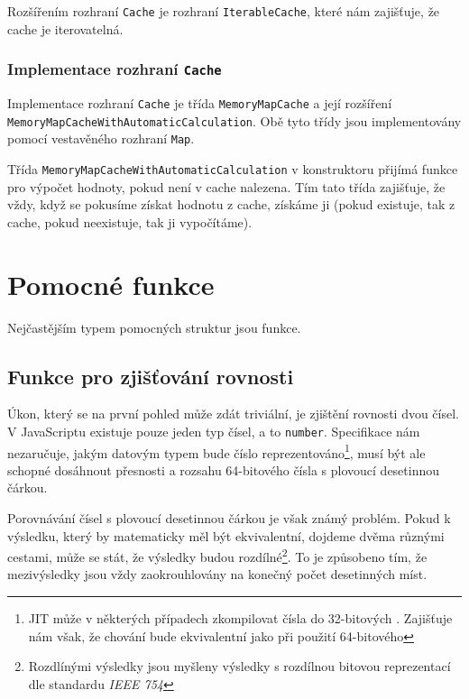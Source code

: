 Rozšířením rozhraní \texttt{Cache} je rozhraní \texttt{IterableCache}\cite[line 49 - 54]{geometryjs:source:interfaces:cache.ts}, které nám zajišťuje, že cache je iterovatelná.

\subsubsection[Implementace]{Implementace rozhraní \texttt{Cache}}
\label{subsubsec:helper-class-cache-implementation}

Implementace rozhraní \texttt{Cache} je třída \texttt{MemoryMapCache}\cite[line 7 - 33]{geometryjs:source:helpers:memoryMapCache.ts} a její rozšíření \texttt{MemoryMapCacheWithAutomaticCalculation}\cite[line 38 - 59]{geometryjs:source:helpers:memoryMapCache.ts}.
Obě tyto třídy jsou implementovány pomocí vestavěného rozhraní \texttt{Map}\cite{mdn:map}.

Třída \texttt{MemoryMapCacheWithAutomaticCalculation} v konstruktoru přijímá funkce pro výpočet hodnoty, pokud není v cache nalezena.
Tím tato třída zajišťuje, že vždy, když se pokusíme získat hodnotu z cache, získáme ji (pokud existuje, tak z cache, pokud neexistuje, tak ji vypočítáme).

\section{Pomocné funkce}
\label{sec:helper-functions}

Nejčastějším typem pomocných struktur jsou funkce. 

\subsection[Rovnost]{Funkce pro zjišťování rovnosti}
\label{subsec:helper-function-equality}

Úkon, který se na první pohled může zdát triviální, je zjištění rovnosti dvou čísel.
V JavaScriptu existuje pouze jeden typ čísel, a to \texttt{number}.
Specifikace nám nezaručuje, jakým datovým typem bude číslo reprezentováno\footnote{JIT může v některých případech zkompilovat čísla do 32-bitových . Zajišťuje nám však, že chování bude ekvivalentní jako při použití 64-bitového }, musí být ale schopné dosáhnout přesnosti a rozsahu 64-bitového čísla s plovoucí desetinnou čárkou\cite{mdn:number}.

Porovnávání čísel s plovoucí desetinnou čárkou je však známý problém\cite{wikipedia:floating-point-arithmetic}.
Pokud k výsledku, který by matematicky měl být ekvivalentní, dojdeme dvěma různými cestami, může se stát, že výsledky budou rozdílné\footnote{Rozdlínými výsledky jsou myšleny výsledky s rozdílnou bitovou reprezentací dle standardu \textit{IEEE 754}\cite{wikipeadia:double-precision-floating-point-format}}.
To je způsobeno tím, že mezivýsledky jsou vždy zaokrouhlovány na konečný počet desetinných míst.

